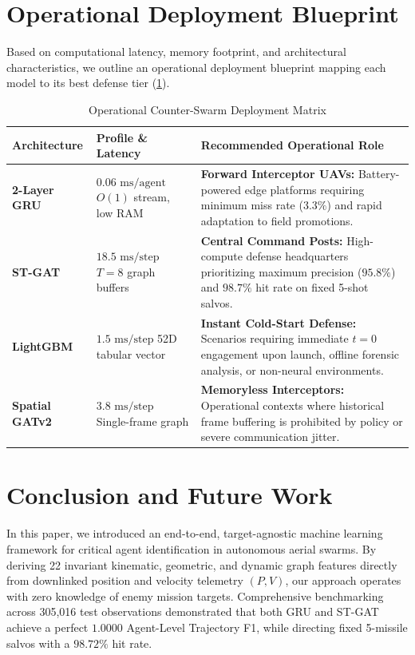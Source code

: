 \documentclass[9pt]{ieeeconf}
\begin{document}
\section{Operational Deployment Blueprint}
\label{sec:deployment}

Based on computational latency, memory footprint, and architectural characteristics, we outline an operational deployment blueprint mapping each model to its best defense tier (\cref{tab:deployment_matrix}).

\begin{table}[h]
\centering
\caption{Operational Counter-Swarm Deployment Matrix}
\label{tab:deployment_matrix}
\scriptsize
\begin{tabularx}{\columnwidth}{l l X}
\toprule
\textbf{Architecture} & \textbf{Profile \& Latency} & \textbf{Recommended Operational Role} \\
\midrule
\textbf{2-Layer GRU} 
& $0.06\text{ ms/agent}$ \newline $O(1)$ stream, low RAM 
& \textbf{Forward Interceptor UAVs:} Battery-powered edge platforms requiring minimum miss rate ($3.3\%$) and rapid adaptation to field promotions. \\
\midrule
\textbf{ST-GAT} 
& $18.5\text{ ms/step}$ \newline $T=8$ graph buffers 
& \textbf{Central Command Posts:} High-compute defense headquarters prioritizing maximum precision ($95.8\%$) and $98.7\%$ hit rate on fixed 5-shot salvos. \\
\midrule
\textbf{LightGBM} 
& $1.5\text{ ms/step}$ \newline 52D tabular vector 
& \textbf{Instant Cold-Start Defense:} Scenarios requiring immediate $t=0$ engagement upon launch, offline forensic analysis, or non-neural environments. \\
\midrule
\textbf{Spatial GATv2} 
& $3.8\text{ ms/step}$ \newline Single-frame graph 
& \textbf{Memoryless Interceptors:} Operational contexts where historical frame buffering is prohibited by policy or severe communication jitter. \\
\bottomrule
\end{tabularx}
\end{table}

\section{Conclusion and Future Work}
\label{sec:conclusion}

In this paper, we introduced an end-to-end, target-agnostic machine learning framework for critical agent identification in autonomous aerial swarms. By deriving 22 invariant kinematic, geometric, and dynamic graph features directly from downlinked position and velocity telemetry $(P, V)$, our approach operates with zero knowledge of enemy mission targets. Comprehensive benchmarking across 305,016 test observations demonstrated that both GRU and ST-GAT achieve a perfect $1.0000$ Agent-Level Trajectory F1, while directing fixed 5-missile salvos with a $98.72\%$ hit rate.
\end{document}
